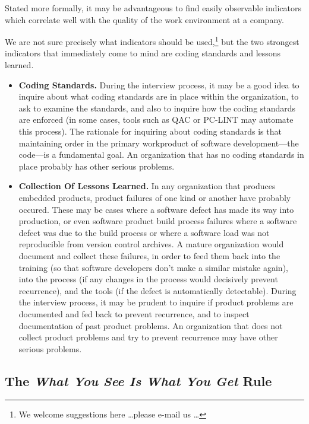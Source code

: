 Stated more formally, it may be advantageous to find easily observable
indicators which correlate well with the quality of the work environment
at a company.

We are not sure precisely what indicators should be used,\footnote{We welcome
suggestions here \ldots please e-mail us \ldots{}} but the two 
strongest indicators that immediately come to mind are coding standards
and lessons learned.

\begin{itemize}
\item \textbf{Coding Standards.}  
      During the interview process, it may be a good idea to inquire about
	  what coding standards are in place within the organization, to 
	  ask to examine the standards, and also to inquire how the coding
	  standards are enforced (in some cases, tools such as QAC or
	  PC-LINT may automate this
	  process).  The rationale for inquiring about coding standards
	  is that maintaining order in the primary workproduct of
	  software development---the code---is a fundamental goal.
	  An organization that has no coding standards in place probably
	  has other serious problems.
\item \textbf{Collection Of Lessons Learned.}
      In any organization that produces embedded products, product failures
	  of one kind or another have probably occured.  These may be cases
	  where a software defect has made its way into production, or even
	  software product build process failures where a software defect
	  was due to the build process or where a software load was not
	  reproducible from version control archives.  A mature organization
	  would document and collect these failures, in order to feed them
	  back into the training (so that software developers don't make a
	  similar mistake again), into the process (if any changes in the process
	  would decisively prevent recurrence), and the tools (if the defect
	  is automatically detectable).  During the interview process, 
	  it may be prudent to inquire if product problems are documented
	  and fed back to prevent recurrence, and to inspect documentation
	  of past product problems.  An organization that does not collect
	  product problems and try to prevent recurrence may have other
	  serious problems.
\end{itemize}

\subsection{The \emph{What You See Is What You Get} Rule}

